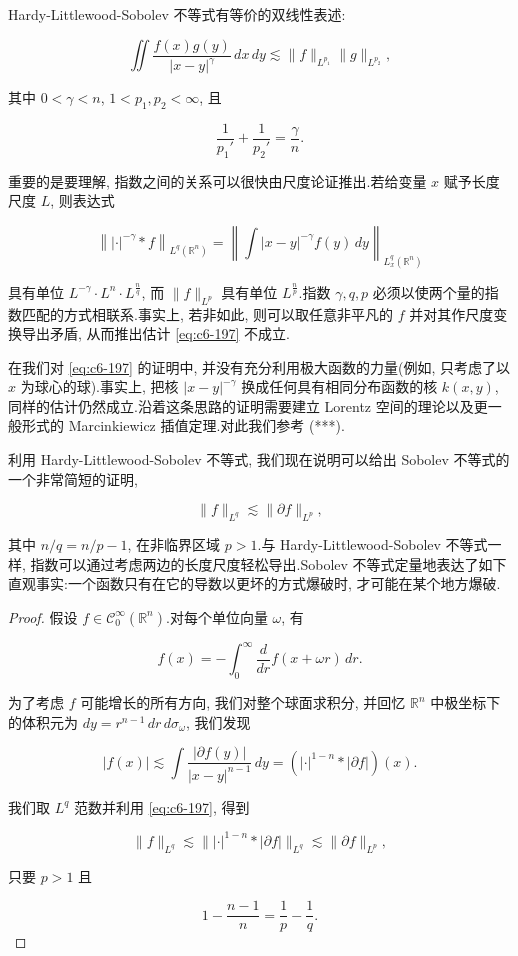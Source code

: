 \begin{remark*}
Hardy-Littlewood-Sobolev 不等式有等价的双线性表述:

\[
\iint\frac{f(x)g(y)}{|x-y|^\gamma}\, dx\, dy \lesssim \|f\|_{L^{p_1}}\|g\|_{L^{p_2}},
\]

其中 $0<\gamma<n$, $1<p_1, p_2<\infty$, 且

\[
\frac{1}{p_1'} + \frac{1}{p_2'} = \frac{\gamma}{n}.
\]

重要的是要理解, 指数之间的关系可以很快由尺度论证推出.若给变量 $x$ 赋予长度尺度 $L$, 则表达式

\[
\left\||\cdot|^{-\gamma}*f\right\|_{L^q(\mathbb{R}^n)} = \left\|\int|x-y|^{-\gamma}f(y)\, dy\right\|_{L_x^q(\mathbb{R}^n)}
\]

具有单位 $L^{-\gamma}\cdot L^n\cdot L^{\frac{n}{q}}$, 而 $\|f\|_{L^p}$ 具有单位 $L^{\frac{n}{p}}$.指数 $\gamma, q, p$ 必须以使两个量的指数匹配的方式相联系.事实上, 若非如此, 则可以取任意非平凡的 $f$ 并对其作尺度变换导出矛盾, 从而推出估计 \eqref{eq:c6-197} 不成立.
\end{remark*}

\begin{remark*}
在我们对 \eqref{eq:c6-197} 的证明中, 并没有充分利用极大函数的力量(例如, 只考虑了以 $x$ 为球心的球).事实上, 把核 $|x-y|^{-\gamma}$ 换成任何具有相同分布函数的核 $k(x, y)$, 同样的估计仍然成立.沿着这条思路的证明需要建立 Lorentz 空间的理论以及更一般形式的 Marcinkiewicz 插值定理.对此我们参考 (***).
\end{remark*}

利用 Hardy-Littlewood-Sobolev 不等式, 我们现在说明可以给出 Sobolev 不等式的一个非常简短的证明,

\[
\|f\|_{L^q} \lesssim \|\partial f\|_{L^p},
\]

其中 $n/q = n/p-1$, 在非临界区域 $p>1$.与 Hardy-Littlewood-Sobolev 不等式一样, 指数可以通过考虑两边的长度尺度轻松导出.Sobolev 不等式定量地表达了如下直观事实:一个函数只有在它的导数以更坏的方式爆破时, 才可能在某个地方爆破.

\begin{proof}
假设 $f\in\mathcal{C}_0^\infty(\mathbb{R}^n)$.对每个单位向量 $\omega$, 有

\[
f(x) = -\int_0^\infty\frac{d}{dr}f(x+\omega r)\, dr.
\]

为了考虑 $f$ 可能增长的所有方向, 我们对整个球面求积分, 并回忆 $\mathbb{R}^n$ 中极坐标下的体积元为 $dy = r^{n-1}\, dr\, d\sigma_\omega$, 我们发现

\[
|f(x)| \lesssim \int\frac{|\partial f(y)|}{|x-y|^{n-1}}\, dy = (|\cdot|^{1-n}*|\partial f|)(x).
\]

我们取 $L^q$ 范数并利用 \eqref{eq:c6-197}, 得到

\[
\|f\|_{L^q} \lesssim \||\cdot|^{1-n}*|\partial f|\|_{L^q} \lesssim \|\partial f\|_{L^p},
\]

只要 $p>1$ 且

\[
1 - \frac{n-1}{n} = \frac{1}{p} - \frac{1}{q}.
\]
\end{proof}


